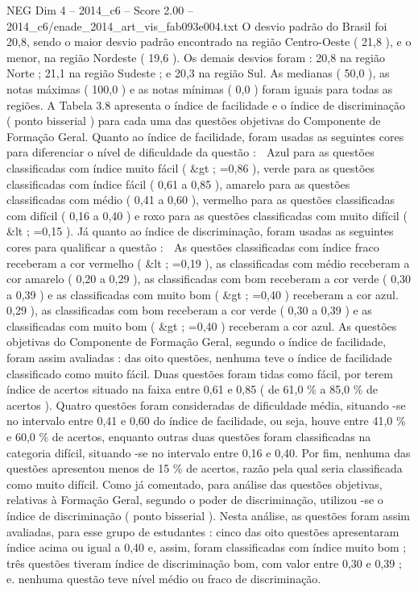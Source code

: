 \begin{textsample}{NEG Dim 4 – 2014\_c6 – Score 2.00 – 2014\_c6/enade\_2014\_art\_vis\_fab093e004.txt}
O desvio padrão do Brasil foi 20,8, sendo o maior desvio padrão encontrado na região Centro-Oeste ( 21,8 ), e o menor, na região Nordeste ( 19,6 ).
Os demais desvios foram : 20,8 na região Norte ; 21,1 na região Sudeste ; e 20,3 na região Sul.
As medianas ( 50,0 ), as notas máximas ( 100,0 ) e as notas mínimas ( 0,0 ) foram iguais para todas as regiões.
A Tabela 3.8 apresenta o índice de facilidade e o índice de discriminação ( ponto bisserial ) para cada uma das questões objetivas do Componente de Formação Geral.
Quanto ao índice de facilidade, foram usadas as seguintes cores para diferenciar o nível de dificuldade da questão :  Azul para as questões classificadas com índice muito fácil ( \&gt ; =0,86 ), verde para as questões classificadas com índice fácil ( 0,61 a 0,85 ), amarelo para as questões classificadas com médio ( 0,41 a 0,60 ), vermelho para as questões classificadas com difícil ( 0,16 a 0,40 ) e roxo para as questões classificadas com muito difícil ( \&lt ; =0,15 ).
Já quanto ao índice de discriminação, foram usadas as seguintes cores para qualificar a questão :  As questões classificadas com índice fraco receberam a cor vermelho ( \&lt ; =0,19 ), as classificadas com médio receberam a cor amarelo ( 0,20 a 0,29 ), as classificadas com bom receberam a cor verde ( 0,30 a 0,39 ) e as classificadas com muito bom ( \&gt ; =0,40 ) receberam a cor azul. 0,29 ), as classificadas com bom receberam a cor verde ( 0,30 a 0,39 ) e as classificadas com muito bom ( \&gt ; =0,40 ) receberam a cor azul.
As questões objetivas do Componente de Formação Geral, segundo o índice de facilidade, foram assim avaliadas : das oito questões, nenhuma teve o índice de facilidade classificado como muito fácil.
Duas questões foram tidas como fácil, por terem índice de acertos situado na faixa entre 0,61 e 0,85 ( de 61,0 \% a 85,0 \% de acertos ).
Quatro questões foram consideradas de dificuldade média, situando -se no intervalo entre 0,41 e 0,60 do índice de facilidade, ou seja, houve entre 41,0 \% e 60,0 \% de acertos, enquanto outras duas questões foram classificadas na categoria difícil, situando -se no intervalo entre 0,16 e 0,40.
Por fim, nenhuma das questões apresentou menos de 15 \% de acertos, razão pela qual seria classificada como muito difícil.
Como já comentado, para análise das questões objetivas, relativas à Formação Geral, segundo o poder de discriminação, utilizou -se o índice de discriminação ( ponto bisserial ).
Nesta análise, as questões foram assim avaliadas, para esse grupo de estudantes : cinco das oito questões apresentaram índice acima ou igual a 0,40 e, assim, foram classificadas com índice muito bom ; três questões tiveram índice de discriminação bom, com valor entre 0,30 e 0,39 ; e. nenhuma questão teve nível médio ou fraco de discriminação.

\end{textsample}
